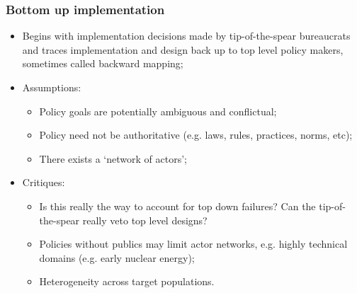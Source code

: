\documentclass[aspectratio=169]{beamer}
\theoremstyle{principle}
\begin{document}
\begin{frame}
\frametitle{Bottom up implementation}

\begin{itemize}
\item Begins with implementation decisions made by tip-of-the-spear bureaucrats and traces implementation and design back up to top level policy makers, sometimes called backward mapping;
\bigskip
\bigskip
\item Assumptions:
\begin{itemize}
\item Policy goals are potentially ambiguous and conflictual;
\item Policy need not be authoritative (e.g. laws, rules, practices, norms, etc);
\item There exists a `network of actors';
\end{itemize}
\bigskip
\bigskip
\item Critiques: 
\begin{itemize}
\item Is this really the way to account for top down failures?  Can the tip-of-the-spear really veto top level designs?
\item Policies without publics may limit actor networks, e.g. highly technical domains (e.g. early nuclear energy);
\item Heterogeneity across target populations.
\end{itemize}
\end{itemize}

\end{frame}
\end{document}

